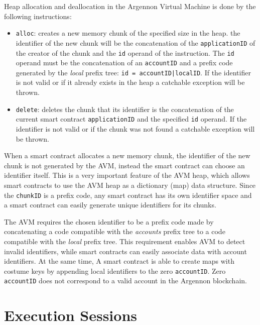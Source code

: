 Heap allocation and deallocation in the Argennon Virtual Machine is done by the following instructions:

\begin{itemize}
    \item \texttt{alloc}: creates a new memory chunk of the specified size in the heap. the identifier
    of the new chunk will be the concatenation of the \texttt{applicationID} of the creator of the chunk and
    the \texttt{id} operand of the instruction. The \texttt{id} operand must be the concatenation of
    an \texttt{accountID} and a prefix code
    generated by the \emph{local} prefix tree: \texttt{id = accountID|localID}. If the identifier is not valid or
    if it already exists in the heap a catchable exception will be thrown.

    \item \texttt{delete}: deletes the chunk that its identifier is the concatenation of the current smart
    contract \texttt{applicationID} and the specified \texttt{id} operand. If the identifier is not valid or
    if the chunk was not found a catchable exception will be thrown.
\end{itemize}

When a smart contract allocates a new memory chunk, the identifier of the new chunk is not generated by
the AVM, instead the smart contract can choose an identifier itself. This is a very important feature of
the AVM heap, which allows smart contracts to use the AVM heap as a dictionary (map) data structure.
Since the \texttt{chunkID} is a prefix code, any smart contract has its own identifier space and a smart contract
can easily generate unique identifiers for its chunks.

The AVM requires the chosen identifier to be a prefix code made by concatenating a code compatible with
the \emph{accounts} prefix tree to a code compatible with the \emph{local} prefix tree. This requirement
enables AVM to detect invalid identifiers, while smart contracts can easily associate data with account identifiers.
At the same time, A smart contract is able to create maps with costume keys by appending local identifiers
to the zero \texttt{accountID}. Zero \texttt{accountID} does not correspond to a valid account in the Argennon
blockchain.


\section{Execution Sessions}\label{sec:execution-sessions}

